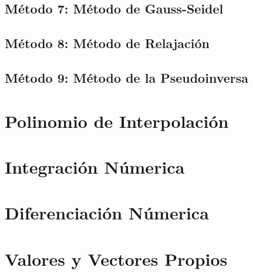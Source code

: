 \documentclass[10pt,a4paper]{article}
\begin{document}
	\subsection{Método 7: Método de Gauss-Seidel}
	
	
					
	\subsection{Método 8: Método de Relajación}
							
	\subsection{Método 9: Método de la Pseudoinversa}
	
	\section{Polinomio de Interpolación}
	
	\section{Integración Númerica}
	
	\section{Diferenciación Númerica}
	
	\section{Valores y Vectores Propios}
	
\end{document}
